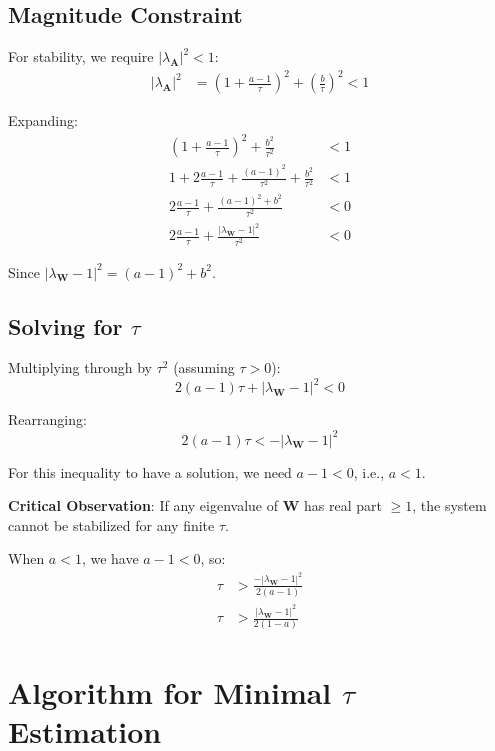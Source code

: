 \documentclass[11pt]{article}
\begin{document}
\subsection{Magnitude Constraint}

For stability, we require $|\lambda_{\mathbf{A}}|^2 < 1$:
\begin{align}
|\lambda_{\mathbf{A}}|^2 &= \left(1 + \frac{a - 1}{\tau}\right)^2 + \left(\frac{b}{\tau}\right)^2 < 1
\end{align}

Expanding:
\begin{align}
\left(1 + \frac{a - 1}{\tau}\right)^2 + \frac{b^2}{\tau^2} &< 1\\
1 + 2\frac{a - 1}{\tau} + \frac{(a - 1)^2}{\tau^2} + \frac{b^2}{\tau^2} &< 1\\
2\frac{a - 1}{\tau} + \frac{(a - 1)^2 + b^2}{\tau^2} &< 0\\
2\frac{a - 1}{\tau} + \frac{|\lambda_{\mathbf{W}} - 1|^2}{\tau^2} &< 0
\end{align}

Since $|\lambda_{\mathbf{W}} - 1|^2 = (a - 1)^2 + b^2$.

\subsection{Solving for $\tau$}

Multiplying through by $\tau^2$ (assuming $\tau > 0$):
\begin{equation}
2(a - 1)\tau + |\lambda_{\mathbf{W}} - 1|^2 < 0
\end{equation}

Rearranging:
\begin{equation}
2(a - 1)\tau < -|\lambda_{\mathbf{W}} - 1|^2
\end{equation}

For this inequality to have a solution, we need $a - 1 < 0$, i.e., $a < 1$.

\textbf{Critical Observation}: If any eigenvalue of $\mathbf{W}$ has real part $\geq 1$, the system cannot be stabilized for any finite $\tau$.

When $a < 1$, we have $a - 1 < 0$, so:
\begin{align}
\tau &> \frac{-|\lambda_{\mathbf{W}} - 1|^2}{2(a - 1)}\\
\tau &> \frac{|\lambda_{\mathbf{W}} - 1|^2}{2(1 - a)}
\end{align}

\section{Algorithm for Minimal $\tau$ Estimation}
\end{document}
